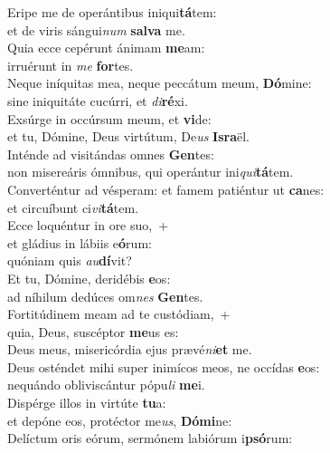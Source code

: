 \evenverse Eripe me de operántibus iniqui\textbf{tá}tem:~\*\\
\evenverse et de viris sángui\textit{num} \textbf{sal}\textbf{va} me.\\
\oddverse Quia ecce cepérunt ánimam \textbf{me}am:~\*\\
\oddverse irruérunt in \textit{me} \textbf{for}tes.\\
\evenverse Neque iníquitas mea, neque peccátum meum, \textbf{Dó}mine:~\*\\
\evenverse sine iniquitáte cucúrri, et \textit{di}\textbf{ré}xi.\\
\oddverse Exsúrge in occúrsum meum, et \textbf{vi}de:~\*\\
\oddverse et tu, Dómine, Deus virtútum, De\textit{us} \textbf{Is}\textbf{ra}ël.\\
\evenverse Inténde ad visitándas omnes \textbf{Gen}tes:~\*\\
\evenverse non misereáris ómnibus, qui operántur ini\textit{qui}\textbf{tá}tem.\\
\oddverse Converténtur ad vésperam: et famem patiéntur ut \textbf{ca}nes:~\*\\
\oddverse et circuíbunt ci\textit{vi}\textbf{tá}tem.\\
\evenverse Ecce loquéntur in ore suo,~+\\
\evenverse  et gládius in lábiis e\textbf{ó}rum:~\*\\
\evenverse quóniam quis \textit{au}\textbf{dí}vit?\\
\oddverse Et tu, Dómine, deridébis \textbf{e}os:~\*\\
\oddverse ad níhilum dedúces om\textit{nes} \textbf{Gen}tes.\\
\evenverse Fortitúdinem meam ad te custódiam,~+\\
\evenverse  quia, Deus, suscéptor \textbf{me}us es:~\*\\
\evenverse Deus meus, misericórdia ejus prævé\textit{ni}\textbf{et} me.\\
\oddverse Deus osténdet mihi super inimícos meos, ne occídas \textbf{e}os:~\*\\
\oddverse nequándo obliviscántur pópu\textit{li} \textbf{me}i.\\
\evenverse Dispérge illos in virtúte \textbf{tu}a:~\*\\
\evenverse et depóne eos, protéctor me\textit{us}, \textbf{Dó}\textbf{mi}ne:\\
\oddverse Delíctum oris eórum, sermónem labiórum i\textbf{psó}rum:~\*\\
